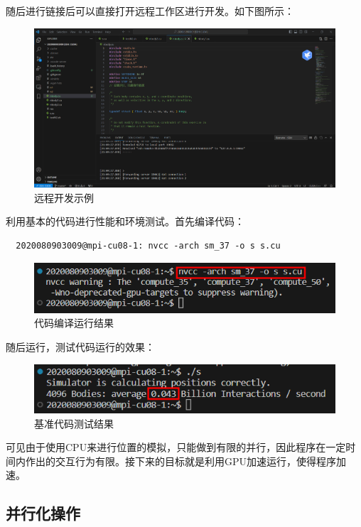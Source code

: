 \documentclass[a4paper,11pt,UTF8]{ctexart}
\begin{document}
随后进行链接后可以直接打开远程工作区进行开发。如下图所示：
\begin {figure}[h]
\centering %
\includegraphics[width=\textwidth]{1602-051421.png}
\caption{远程开发示例} %
\label{five}
\end {figure}
\newpage

利用基本的代码进行性能和环境测试。首先编译代码：
\begin{lstlisting}
  2020080903009@mpi-cu08-1: nvcc -arch sm_37 -o s s.cu
\end{lstlisting}
\begin {figure}[h]
\centering %
\includegraphics[width=\textwidth]{2204-051421.png}
\caption{代码编译运行结果} %
\label{five}
\end {figure}

随后运行，测试代码运行的效果：

\begin {figure}[h]
\centering %
\includegraphics[width=\textwidth]{2501-051421.png}
\caption{基准代码测试结果} %
\label{five}
\end {figure}

可见由于使用CPU来进行位置的模拟，只能做到有限的并行，因此程序在一定时间内作出的交互行为有限。接下来的目标就是利用GPU加速运行，使得程序加速。

\subsection{并行化操作}
\end{document}

